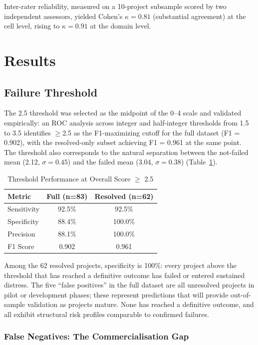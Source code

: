 \documentclass[conference]{IEEEtran}
\begin{document}
Inter-rater reliability, measured on a 10-project subsample scored by two independent assessors, yielded Cohen's $\kappa = 0.81$ (substantial agreement) at the cell level, rising to $\kappa = 0.91$ at the domain level.

\section{Results}

\subsection{Failure Threshold}

The 2.5 threshold was selected as the midpoint of the 0--4 scale and validated empirically: an ROC analysis across integer and half-integer thresholds from 1.5 to 3.5 identifies $\geq$2.5 as the F1-maximizing cutoff for the full dataset (F1 = 0.902), with the resolved-only subset achieving F1 = 0.961 at the same point. The threshold also corresponds to the natural separation between the not-failed mean (2.12, $\sigma = 0.45$) and the failed mean (3.04, $\sigma = 0.38$) (Table~\ref{tab:threshold}).

\begin{table}[htbp]
\caption{Threshold Performance at Overall Score $\geq$ 2.5}
\label{tab:threshold}
\centering
\begin{tabular}{lcc}
\toprule
\textbf{Metric} & \textbf{Full (n=83)} & \textbf{Resolved (n=62)} \\
\midrule
Sensitivity & 92.5\% & 92.5\% \\
Specificity & 88.4\% & 100.0\% \\
Precision & 88.1\% & 100.0\% \\
F1 Score & 0.902 & 0.961 \\
\bottomrule
\end{tabular}
\end{table}

Among the 62 resolved projects, specificity is 100\%: every project above the threshold that has reached a definitive outcome has failed or entered sustained distress. The five ``false positives'' in the full dataset are all unresolved projects in pilot or development phases; these represent predictions that will provide out-of-sample validation as projects mature. None has reached a definitive outcome, and all exhibit structural risk profiles comparable to confirmed failures.

\subsubsection{False Negatives: The Commercialisation Gap}
\end{document}
